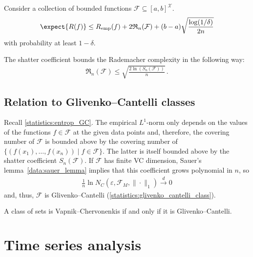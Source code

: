     \begin{property}
        Consider a collection of bounded functions $\mathcal{F}\subseteq[a,b]^{\mathcal{X}}$.
        \begin{gather}
            \expect{R(f)}\leq R_{\text{emp}}(f)+2\mathfrak{R}_n(\mathcal{F})+(b-a)\sqrt{\frac{\log(1/\delta)}{2n}}
        \end{gather}
        with probability at least $1-\delta$.
    \end{property}

    \begin{property}[VC dimension]
        The shatter coefficient bounds the Rademacher complexity in the following way:
        \begin{gather}
            \mathfrak{R}_n(\mathcal{F})\leq\sqrt{\frac{2\ln(S_n(\mathcal{F}))}{n}}\,.
        \end{gather}
    \end{property}

\subsection{Relation to Glivenko--Cantelli classes}

    \begin{property}
        Recall \cref{statistics:entrop_GC}. The empirical $L^1$-norm only depends on the values of the functions $f\in\mathcal{F}$ at the given data points and, therefore, the covering number of $\mathcal{F}$ is bounded above by the covering number of $\{(f(x_1),\ldots,f(x_n))\mid f\in\mathcal{F}\}$. The latter is itself bounded above by the shatter coefficient $S_n(\mathcal{F})$. If $\mathcal{F}$ has finite VC dimension, Sauer's lemma~\ref{data:sauer_lemma} implies that this coefficient grows polynomial in $n$, so
        \begin{gather}
            \frac{1}{n}\ln N_C(\varepsilon,\mathcal{F}_M,\|\cdot\|_1)\overset{d}{\longrightarrow}0
        \end{gather}
        and, thus, $\mathcal{F}$ is Glivenko--Cantelli (\cref{statistics:glivenko_cantelli_class}).
    \end{property}

    \begin{theorem}
        A class of sets is Vapnik--Chervonenkis if and only if it is Glivenko--Cantelli.
    \end{theorem}

\section{Time series analysis}

